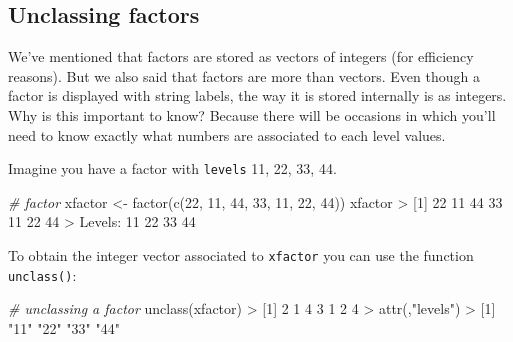 \documentclass[
]{book}
\newenvironment{Shaded}{\begin{snugshade}}{\end{snugshade}}
\newcommand{\CommentTok}[1]{\textcolor[rgb]{0.56,0.35,0.01}{\textit{#1}}}
\newcommand{\DecValTok}[1]{\textcolor[rgb]{0.00,0.00,0.81}{#1}}
\newcommand{\FunctionTok}[1]{\textcolor[rgb]{0.00,0.00,0.00}{#1}}
\newcommand{\NormalTok}[1]{#1}
\newcommand{\OtherTok}[1]{\textcolor[rgb]{0.56,0.35,0.01}{#1}}
\newcommand{\SpecialCharTok}[1]{\textcolor[rgb]{0.00,0.00,0.00}{#1}}
\newcommand{\StringTok}[1]{\textcolor[rgb]{0.31,0.60,0.02}{#1}}
\begin{document}
\hypertarget{unclassing-factors}{%
\subsection{Unclassing factors}\label{unclassing-factors}}

We've mentioned that factors are stored as vectors of integers (for efficiency
reasons). But we also said that factors are more than vectors. Even though a
factor is displayed with string labels, the way it is stored internally is as
integers. Why is this important to know? Because there will be occasions in
which you'll need to know exactly what numbers are associated to each level
values.

Imagine you have a factor with \texttt{levels} 11, 22, 33, 44.

\begin{Shaded}
\begin{Highlighting}[]
\CommentTok{\# factor}
\NormalTok{xfactor }\OtherTok{\textless{}{-}} \FunctionTok{factor}\NormalTok{(}\FunctionTok{c}\NormalTok{(}\DecValTok{22}\NormalTok{, }\DecValTok{11}\NormalTok{, }\DecValTok{44}\NormalTok{, }\DecValTok{33}\NormalTok{, }\DecValTok{11}\NormalTok{, }\DecValTok{22}\NormalTok{, }\DecValTok{44}\NormalTok{))}
\NormalTok{xfactor}
\SpecialCharTok{\textgreater{}}\NormalTok{ [}\DecValTok{1}\NormalTok{] }\DecValTok{22} \DecValTok{11} \DecValTok{44} \DecValTok{33} \DecValTok{11} \DecValTok{22} \DecValTok{44}
\SpecialCharTok{\textgreater{}}\NormalTok{ Levels}\SpecialCharTok{:} \DecValTok{11} \DecValTok{22} \DecValTok{33} \DecValTok{44}
\end{Highlighting}
\end{Shaded}

To obtain the integer vector associated to \texttt{xfactor} you can use the function
\texttt{unclass()}:

\begin{Shaded}
\begin{Highlighting}[]
\CommentTok{\# unclassing a factor}
\FunctionTok{unclass}\NormalTok{(xfactor)}
\SpecialCharTok{\textgreater{}}\NormalTok{ [}\DecValTok{1}\NormalTok{] }\DecValTok{2} \DecValTok{1} \DecValTok{4} \DecValTok{3} \DecValTok{1} \DecValTok{2} \DecValTok{4}
\SpecialCharTok{\textgreater{}} \FunctionTok{attr}\NormalTok{(,}\StringTok{"levels"}\NormalTok{)}
\SpecialCharTok{\textgreater{}}\NormalTok{ [}\DecValTok{1}\NormalTok{] }\StringTok{"11"} \StringTok{"22"} \StringTok{"33"} \StringTok{"44"}
\end{Highlighting}
\end{Shaded}
\end{document}
